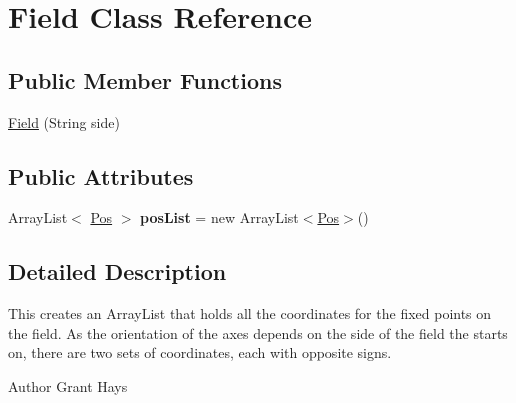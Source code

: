\hypertarget{classField}{
\section{Field Class Reference}
\label{classField}
}
\subsection*{Public Member Functions}
\begin{DoxyCompactItemize}
\item 
\hyperlink{classField_a4623eecd51b10ad51ba23d6c9e2c606a}{Field} (String side)
\end{DoxyCompactItemize}
\subsection*{Public Attributes}
\begin{DoxyCompactItemize}
\item 
\hypertarget{classField_a3790ce0f52c5d20bd396d58df70ae5a8}{
ArrayList$<$ \hyperlink{classPos}{Pos} $>$ {\bfseries posList} = new ArrayList$<$\hyperlink{classPos}{Pos}$>$()}
\label{classField_a3790ce0f52c5d20bd396d58df70ae5a8}

\end{DoxyCompactItemize}


\subsection{Detailed Description}
This creates an ArrayList that holds all the coordinates for the fixed points on the field. As the orientation of the axes depends on the side of the field the starts on, there are two sets of coordinates, each with opposite signs.

\begin{DoxyAuthor}{Author}
Grant Hays 
\end{DoxyAuthor}


